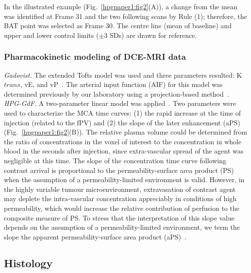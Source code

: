 In the illustrated example (Fig.~\ref{hpgpaper1:fig2}(A)), a change from the mean was identified at Frame 31 and the two following scans by Rule (1); therefore, the \acs{BAT} point was selected as Frame 30.
The centre line (mean of baseline) and upper and lower control limits ($\pm$3 SDs) are drawn for reference.

\subsubsection{Pharmacokinetic modeling of DCE-MRI data}

\textit{Gadovist.} The extended Tofts model was used and three parameters resulted: K${trans}$, vE, and vP~\cite{Sourbron:2011ce}.
The arterial input function (AIF) for this model was determined previously by our laboratory using a projection-based method~\cite{Moroz:2013ee}.
\textit{HPG-GdF.} A two-parameter linear model was applied~\cite{Pathak:2005gu}.
Two parameters were used to characterize the \acs{MCA} time curves: (1) the rapid increase at the time of injection (related to the \acs{fPV}) and (2) the slope of the later enhancement (aPS) (Fig.~\ref{hpgpaper1:fig2}(B)).
The relative plasma volume could be determined from the ratio of concentrations in the voxel of interest to the concentration in whole blood in the seconds after injection, since extra-vascular spread of the agent was negligible at this time.
The slope of the concentration time curve following contrast arrival is proportional to the permeability-surface area product (PS) when the assumption of a permeability-limited environment is valid.
However, in the highly variable tumour microenvironment, extravasation of contrast agent may deplete the intra-vascular concentration appreciably in conditions of high permeability, which would increase the relative contribution of perfusion to the composite measure of PS.
To stress that the interpretation of this slope value depends on the assumption of a permeability-limited environment, we term the slope the apparent permeability-surface area product (aPS)~\cite{DaldrupLink:2004gy,Dafni:2002kb}.

\subsection{Histology}

